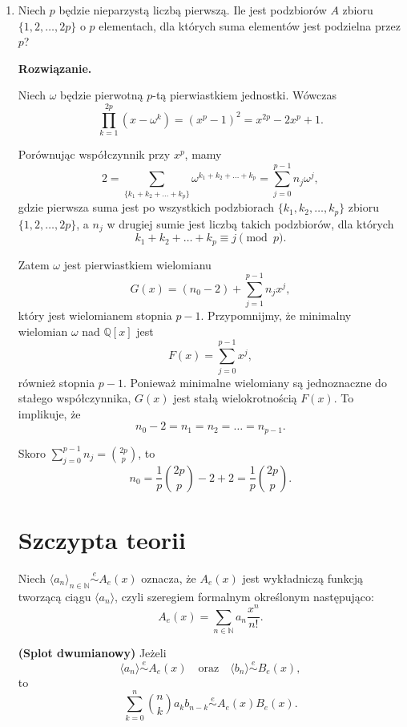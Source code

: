 \documentclass{lecture-kuznia}
\newenvironment{solutionbox}{%
    \begin{mdframed}[style=solstyle]\noindent\textbf{Rozwiązanie.}\par\smallskip
  }{%
    \end{mdframed}
  }
\begin{document}
\begin{enumerate}[label=\textbf{Zad. \arabic*}]
\begin{solutionbox}
Stąd liczba takich wielomianów wynosi
\[
a_n = \left\lfloor \frac{n}{2} \right\rfloor + 1.
\]

\end{solutionbox}

\item Niech \(p\) będzie nieparzystą liczbą pierwszą. Ile jest podzbiorów \(A\) zbioru 
\(\{1, 2, \dots, 2p\}\) o \(p\) elementach, dla których suma elementów jest podzielna przez \(p\)?
\begin{solutionbox}

Niech $\omega$ będzie pierwotną $p$-tą pierwiastkiem jednostki. Wówczas
\[
\prod_{k=1}^{2p} (x - \omega^k) = (x^p - 1)^2 = x^{2p} - 2x^p + 1.
\]

Porównując współczynnik przy $x^p$, mamy
\[
2 = \sum_{\{k_1+k_2+\dots+k_p\}} \omega^{k_1 + k_2 + \dots + k_p} = \sum_{j=0}^{p-1} n_j \omega^j,
\]
gdzie pierwsza suma jest po wszystkich podzbiorach $\{k_1, k_2, \dots, k_p\}$ zbioru $\{1,2,\dots,2p\}$, a $n_j$ w drugiej sumie jest liczbą takich podzbiorów, dla których
\[
k_1 + k_2 + \dots + k_p \equiv j \pmod{p}.
\]

Zatem $\omega$ jest pierwiastkiem wielomianu
\[
G(x) = (n_0 - 2) + \sum_{j=1}^{p-1} n_j x^j,
\]
który jest wielomianem stopnia $p-1$. Przypomnijmy, że minimalny wielomian $\omega$ nad $\mathbb{Q}[x]$ jest
\[
F(x) = \sum_{j=0}^{p-1} x^j,
\]
również stopnia $p-1$. Ponieważ minimalne wielomiany są jednoznaczne do stałego współczynnika, $G(x)$ jest stałą wielokrotnością $F(x)$. To implikuje, że
\[
n_0 - 2 = n_1 = n_2 = \dots = n_{p-1}.
\]

Skoro $\sum_{j=0}^{p-1} n_j = \binom{2p}{p}$, to
\[
n_0 = \frac{1}{p} \binom{2p}{p} - 2 + 2 = \frac{1}{p} \binom{2p}{p}.
\]
\end{solutionbox}

\section{\huge{Szczypta teorii}}

Niech $\langle a_n \rangle_{n \in \mathbb{N}} \overset{e}{\sim} A_e(x)$ oznacza, że $A_e(x)$ jest wykładniczą funkcją tworzącą ciągu $\langle a_n \rangle$, czyli szeregiem formalnym określonym następująco:
\[
A_e(x) = \sum_{n \in \mathbb{N}} a_n \frac{x^n}{n!}.
\]

\textbf{(Splot dwumianowy)} Jeżeli 
\[
\langle a_n \rangle \overset{e}{\sim} A_e(x) \quad \text{oraz} \quad \langle b_n \rangle \overset{e}{\sim} B_e(x),
\]
to
\[
\sum_{k=0}^{n} \binom{n}{k} a_k b_{n-k} \overset{e}{\sim} A_e(x) B_e(x).
\]


\end{enumerate}
\end{document}
